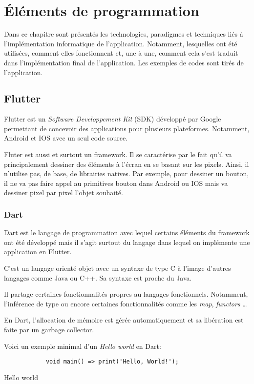 
\chapter[Éléments de programmation]{Éléments de programmation}
Dans ce chapitre sont présentés les technologies, paradigmes
et techniques liés à l'implémentation informatique de
l'application. Notamment, lesquelles ont été utilisées,
comment elles fonctionnent et, une à une, comment cela
s’est traduit dans l'implémentation final de l'application.
Les exemples de codes sont tirés de l'application.


\section{Flutter}
Flutter est un \textit{Software Developpement Kit} (SDK) développé par Google permettant de concevoir
des applications pour plusieurs plateformes. Notamment, Android et IOS avec un seul code source.

Fluter est aussi et surtout un framework. Il se caractérise par le fait qu'il va principalement dessiner des éléments
à l'écran en se basant sur les pixels. Ainsi, il n'utilise pas, de base, de librairies natives. Par exemple, pour dessiner un
bouton, il ne va pas faire appel au primitives bouton dans Android ou IOS mais va dessiner pixel par pixel
l'objet souhaité.

\subsection{Dart}
Dart est le langage de programmation avec lequel certains éléments du framework ont été développé mais il s'agit
surtout du langage dans lequel on implémente une application en Flutter.

C'est un langage orienté objet avec un syntaxe de type C à l'image d'autres langages comme Java ou C++.
Sa syntaxe est proche du Java.

Il partage certaines fonctionnalités propres au langages fonctionnels. Notamment, l'inférence de type ou encore
certaines fonctionnalités comme les \textit{map}, \textit{functors} \dots

En Dart, l'allocation de mémoire est gérée automatiquement et sa libération est faite par un garbage collector.

Voici un exemple minimal d'un \textit{Hello world} en Dart:
\begin{listing}[!h]
    \begin{verbatim}
            void main() => print('Hello, World!');
        \end{verbatim}
    \label{code:helloWorld}
    \caption{Hello world}
\end{listing}
\newpage


